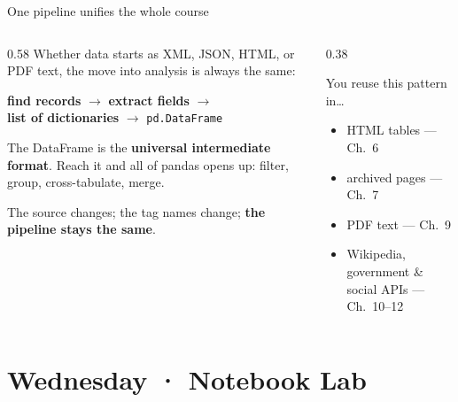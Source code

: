 \documentclass[9pt,aspectratio=169]{beamer}
\begin{document}
\begin{frame}{One pipeline unifies the whole course}
    \begin{columns}[T]
        \begin{column}{0.58\textwidth}
            Whether data starts as XML, JSON, HTML, or PDF text, the move into analysis is always the same:

            \vspace{0.6em}
            \begin{center}
                \textbf{find records} $\rightarrow$ \textbf{extract fields} $\rightarrow$\\[0.2em] \textbf{list of dictionaries} $\rightarrow$ \texttt{pd.DataFrame}
            \end{center}

            \vspace{0.6em}
            The DataFrame is the \textbf{universal intermediate format}. Reach it and all of pandas opens up: filter, group, cross-tabulate, merge.

            \vspace{0.6em}
            The source changes; the tag names change; \textbf{the pipeline stays the same}.
        \end{column}
        \begin{column}{0.38\textwidth}
            \begin{block}{You reuse this pattern in\dots}
                \footnotesize
                \begin{itemize}\footnotesize
                    \item HTML tables --- Ch.~6
                    \item archived pages --- Ch.~7
                    \item PDF text --- Ch.~9
                    \item Wikipedia, government \& social APIs --- Ch.~10--12
                \end{itemize}
            \end{block}
        \end{column}
    \end{columns}
\end{frame}

\section{Wednesday · Notebook Lab}
\end{document}
